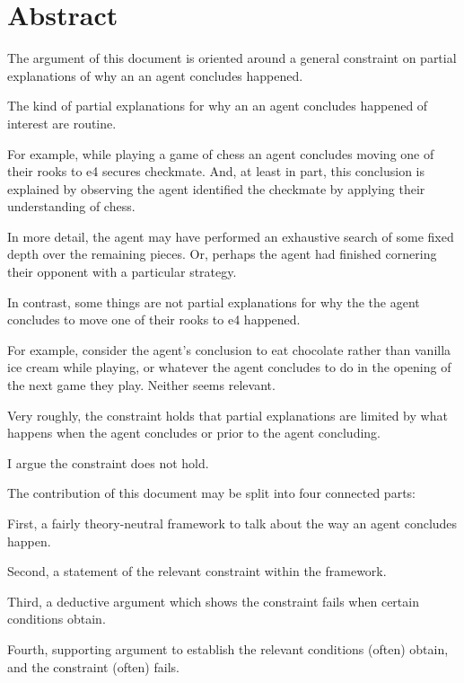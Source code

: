 \chapter*{Abstract}
\label{cha:abstract}

\begin{note}
  The argument of this document is oriented around a general constraint on partial explanations of why an \eiw{} an agent concludes happened.
\end{note}

\begin{note}
  The kind of partial explanations for why an \eiw{} an agent concludes happened of interest are routine.

  For example, while playing a game of chess an agent concludes moving one of their rooks to e4 secures checkmate.
  And, at least in part, this conclusion is explained by observing the agent identified the checkmate by applying their understanding of chess.

  In more detail, the agent may have performed an exhaustive search of some fixed depth over the remaining pieces.
  Or, perhaps the agent had finished cornering their opponent with a particular strategy.
\end{note}

\begin{note}
  In contrast, some things are not partial explanations for why the \eiw{} the agent concludes to move one of their rooks to e4 happened.

  For example, consider the agent's conclusion to eat chocolate rather than vanilla ice cream while playing, or whatever the agent concludes to do in the opening of the next game they play.
  Neither seems relevant.
\end{note}

\begin{note}
  Very roughly, the constraint holds that partial explanations are limited by what happens when the agent concludes or prior to the agent concluding.

  I argue the constraint does not hold.
\end{note}

\begin{note}
  The contribution of this document may be split into four connected parts:

  First, a fairly theory-neutral framework to talk about the way  an agent concludes happen.

  Second, a statement of the relevant constraint within the framework.

  Third, a deductive argument which shows the constraint fails when certain conditions obtain.

  Fourth, supporting argument to establish the relevant conditions (often) obtain, and the constraint (often) fails.
\end{note}


